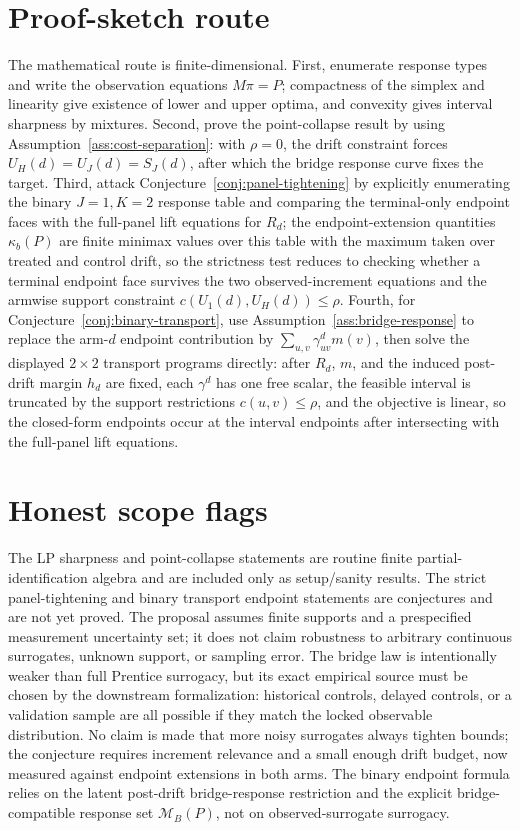 \documentclass[11pt]{article}
\theoremstyle{definition}
\theoremstyle{plain}
\theoremstyle{remark}
\begin{document}
\section{Proof-sketch route}
The mathematical route is finite-dimensional.  First, enumerate response types and write the observation equations \(M\pi=P\); compactness of the simplex and linearity give existence of lower and upper optima, and convexity gives interval sharpness by mixtures.  Second, prove the point-collapse result by using Assumption~\ref{ass:cost-separation}: with \(\rho=0\), the drift constraint forces \(U_H(d)=U_J(d)=S_J(d)\), after which the bridge response curve fixes the target.  Third, attack Conjecture~\ref{conj:panel-tightening} by explicitly enumerating the binary \(J=1,K=2\) response table and comparing the terminal-only endpoint faces with the full-panel lift equations for \(R_d\); the endpoint-extension quantities \(\kappa_b(P)\) are finite minimax values over this table with the maximum taken over treated and control drift, so the strictness test reduces to checking whether a terminal endpoint face survives the two observed-increment equations and the armwise support constraint \(c(U_1(d),U_H(d))\le\rho\).  Fourth, for Conjecture~\ref{conj:binary-transport}, use Assumption~\ref{ass:bridge-response} to replace the arm-\(d\) endpoint contribution by \(\sum_{u,v}\gamma^d_{uv}m(v)\), then solve the displayed \(2\times2\) transport programs directly: after \(R_d\), \(m\), and the induced post-drift margin \(h_d\) are fixed, each \(\gamma^d\) has one free scalar, the feasible interval is truncated by the support restrictions \(c(u,v)\le\rho\), and the objective is linear, so the closed-form endpoints occur at the interval endpoints after intersecting with the full-panel lift equations.

\section{Honest scope flags}
The LP sharpness and point-collapse statements are routine finite partial-identification algebra and are included only as setup/sanity results.  The strict panel-tightening and binary transport endpoint statements are conjectures and are not yet proved.  The proposal assumes finite supports and a prespecified measurement uncertainty set; it does not claim robustness to arbitrary continuous surrogates, unknown support, or sampling error.  The bridge law is intentionally weaker than full Prentice surrogacy, but its exact empirical source must be chosen by the downstream formalization: historical controls, delayed controls, or a validation sample are all possible if they match the locked observable distribution.  No claim is made that more noisy surrogates always tighten bounds; the conjecture requires increment relevance and a small enough drift budget, now measured against endpoint extensions in both arms.  The binary endpoint formula relies on the latent post-drift bridge-response restriction and the explicit bridge-compatible response set \(\mathcal{M}_B(P)\), not on observed-surrogate surrogacy.
\end{document}
